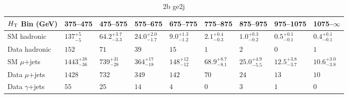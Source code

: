 \documentclass[8pt]{article}
\def\scalht{\mbox{$H_{\rm{T}}$}\xspace}
\newcommand\T{\rule{0pt}{2.6ex}}
\newcommand\B{\rule[-1.2ex]{0pt}{0pt}}
\begin{document}
\begin{table}[ht!]
\caption{2b ge2j}
\label{tab:ensemble-2b ge2j}
\centering
\begin{tabular}{ lllllllll }

\hline
\scalht Bin (GeV)       & 375--475                       & 475--575                       & 575--675                       & 675--775                       & 775--875                       & 875--975                       & 975--1075                      & 1075--$\infty$                 \\ [1.000000ex]
\hline
SM hadronic\T           & $137^{+5}_{-5}$                & $64.2^{+3.7}_{-3.3}$           & $24.0^{+2.0}_{-1.7}$           & $9.0^{+1.3}_{-1.2}$            & $2.1^{+0.4}_{-0.3}$            & $1.0^{+0.3}_{-0.2}$            & $0.5^{+0.1}_{-0.1}$            & $0.4^{+0.1}_{-0.1}$            \\ 
Data hadronic\B         & $152$                          & $71$                           & $39$                           & $15$                           & $1$                            & $2$                            & $0$                            & $1$                            \\ 
\hline
SM $\mu$+jets\T         & $1443^{+38}_{-36}$             & $739^{+31}_{-28}$              & $364^{+17}_{-18}$              & $148^{+12}_{-12}$              & $68.9^{+8.7}_{-8.1}$           & $25.0^{+4.9}_{-5.5}$           & $12.5^{+3.8}_{-3.7}$           & $10.6^{+3.0}_{-3.8}$           \\ 
Data $\mu$+jets\B       & $1428$                         & $732$                          & $349$                          & $142$                          & $70$                           & $24$                           & $13$                           & $10$                           \\ 
\hline
Data $\gamma$+jets\B    & $55$                           & $25$                           & $14$                           & $4$                            & $0$                            & $3$                            & $1$                            & $0$                            \\ 
\hline

\end{tabular}
\end{table}
\end{document}
